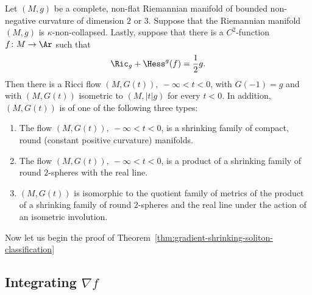 \begin{theorem}\label{thm:gradient-shrinking-soliton-classification}
\label{GSSclass}
Let $(M,g)$ be a  complete, non-flat Riemannian manifold of bounded
non-negative curvature of dimension $2$ or $3$. Suppose that the
Riemannian manifold $(M,g)$ is $\kappa$-non-collapsed. Lastly,
suppose that there is a $C^2$-function $f\colon M \to \Ar$ such that
$$\Ric_{g}+\Hess^{g}(f)=\frac{1}{2}g.$$
 Then there is a Ricci flow $(M,G(t)),\ -\infty<t<0$, with $G(-1)=g$ and with $(M,G(t))$ isometric
 to $(M,|t|g)$ for every $t<0$. In addition, $(M,G(t))$ is of one
 of the following three types:
\begin{enumerate}
\item[(1)] The flow $(M,G(t)),\ -\infty<t<0$, is a shrinking family of
compact, round (constant positive curvature) manifolds.
\item[(2)] The flow $(M,G(t)),\ -\infty<t<0$, is a product of a shrinking family
of round $2$-spheres with the real line. \item[(3)] $(M,G(t))$ is
isomorphic to the quotient family of metrics of the product of a
shrinking family of round $2$-spheres and the real line under the
action of an isometric involution.
\end{enumerate}
\end{theorem}



Now let us begin the proof of Theorem~\ref{thm:gradient-shrinking-soliton-classification}


\subsection{Integrating $\nabla f$}

